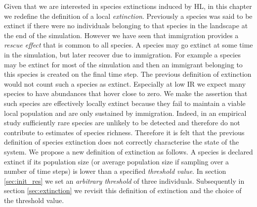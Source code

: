 Given that we are interested in species extinctions induced by HL, in this chapter we redefine the definition of a local \emph{extinction}. Previously a species was said to be extinct if there were no individuals belonging to that species in the landscape at the end of the simulation. However we have seen that immigration provides a \emph{rescue effect} that is common to all species. A species may go extinct at some time in the simulation, but later recover due to immigration. For example a species may be extinct for most of the simulation and then an immigrant belonging to this species is created on the final time step. The previous definition of extinction would not count such a species as extinct. Especially at low IR we expect many species to have abundances that hover close to zero. We make the assertion that such species are effectively locally extinct because they fail to maintain a viable local population and are only sustained by immigration. Indeed, in an empirical study sufficiently rare species are unlikely to be detected and therefore do not contribute to estimates of species richness. Therefore it is felt that the previous definition of species extinction does not correctly characterise the state of the system. We propose a new definition of extinction as follows. A species  is declared extinct if its population size (or average population size if sampling over a number of time steps) is lower than a specified \emph{threshold value}. In section \ref{sec:init_res} we set an \emph{arbitrary threshold} of three individuals. Subsequently in section \ref{sec:extinction} we revisit this definition of extinction and the choice of the threshold value.




